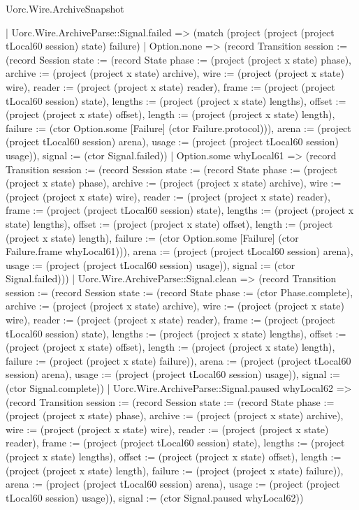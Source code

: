 \begin{lexlean}{Uorc.Wire.ArchiveSnapshot}
\begin{semanticmodule}
{        | Uorc.Wire.ArchiveParse::Signal.failed => (match (project (project (project tLocal60 session) state) failure)
          | Option.none => (record Transition {session := (record Session {state := (record State {phase := (project (project x state) phase), archive := (project (project x state) archive), wire := (project (project x state) wire), reader := (project (project x state) reader), frame := (project (project tLocal60 session) state), lengths := (project (project x state) lengths), offset := (project (project x state) offset), length := (project (project x state) length), failure := (ctor Option.some [Failure] (ctor Failure.protocol))}), arena := (project (project tLocal60 session) arena), usage := (project (project tLocal60 session) usage)}), signal := (ctor Signal.failed)})
          | Option.some whyLocal61 => (record Transition {session := (record Session {state := (record State {phase := (project (project x state) phase), archive := (project (project x state) archive), wire := (project (project x state) wire), reader := (project (project x state) reader), frame := (project (project tLocal60 session) state), lengths := (project (project x state) lengths), offset := (project (project x state) offset), length := (project (project x state) length), failure := (ctor Option.some [Failure] (ctor Failure.frame whyLocal61))}), arena := (project (project tLocal60 session) arena), usage := (project (project tLocal60 session) usage)}), signal := (ctor Signal.failed)}))
        | Uorc.Wire.ArchiveParse::Signal.clean => (record Transition {session := (record Session {state := (record State {phase := (ctor Phase.complete), archive := (project (project x state) archive), wire := (project (project x state) wire), reader := (project (project x state) reader), frame := (project (project tLocal60 session) state), lengths := (project (project x state) lengths), offset := (project (project x state) offset), length := (project (project x state) length), failure := (project (project x state) failure)}), arena := (project (project tLocal60 session) arena), usage := (project (project tLocal60 session) usage)}), signal := (ctor Signal.complete)})
        | Uorc.Wire.ArchiveParse::Signal.paused whyLocal62 => (record Transition {session := (record Session {state := (record State {phase := (project (project x state) phase), archive := (project (project x state) archive), wire := (project (project x state) wire), reader := (project (project x state) reader), frame := (project (project tLocal60 session) state), lengths := (project (project x state) lengths), offset := (project (project x state) offset), length := (project (project x state) length), failure := (project (project x state) failure)}), arena := (project (project tLocal60 session) arena), usage := (project (project tLocal60 session) usage)}), signal := (ctor Signal.paused whyLocal62)})
}
\end{semanticmodule}
\end{lexlean}
